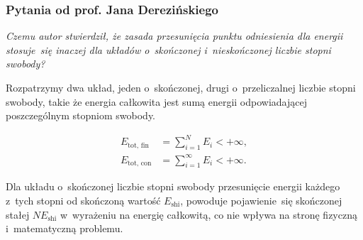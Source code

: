 \documentclass[10pt,t]{beamer}
\begin{document}
\begin{frame}
  \frametitle{Pytania od prof. Jana Derezińskiego}


  \textit{Czemu autor stwierdził, że zasada przesunięcia punktu odniesienia
    dla energii stosuje~się inaczej dla układów o~skończonej i~nieskończonej
    liczbie stopni swobody?}

  Rozpatrzymy dwa układ, jeden o~skończonej, drugi o~przeliczalnej liczbie
  stopni swobody, takie że energia całkowita jest sumą energii
  odpowiadającej poszczególnym stopniom swobody.

  \vspace{-1.8em}



  \begin{subequations}

    \begin{align}
      \label{eq:Algebraiczne-podejscie-ETC-01}
      E_{ \text{tot, fin} }
      &=
        \sum_{ i = 1 }^{ N } E_{ i } < +\infty, \\
        \label{eq:Algebraiczne-podejscie-ETC-01}
      E_{ \text{tot, con} }
      &=
        \sum_{ i = 1 }^{ \infty } E_{ i } < +\infty.
    \end{align}

  \end{subequations}

  \vspace{-1em}


  Dla układu o~skończonej liczbie stopni swobody przesunięcie energii
  każdego z~tych stopni od skończoną wartość $E_{ \text{shi} }$, powoduje
  pojawienie~się skończonej stałej $N E_{ \text{shi} }$ w~wyrażeniu na
  energię całkowitą, co nie wpływa na stronę fizyczną
  i~matematyczną problemu. %

\end{frame}
\end{document}
